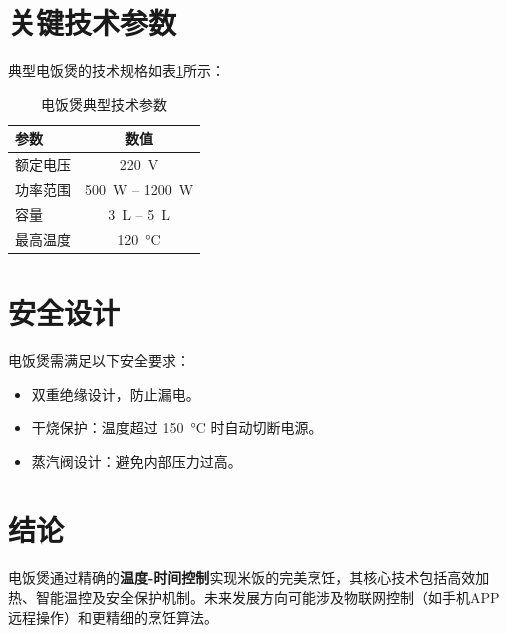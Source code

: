 \documentclass[UTF8]{ctexart}
\begin{document}
\section{关键技术参数}
典型电饭煲的技术规格如表\ref{tab:specs}所示：
\begin{table}[ht]%
    \centering
    \begin{tabular}{|l|c|}%
        \hline
        \textbf{参数} & \textbf{数值} \\ \hline
        额定电压 & \SI{220}{\volt} \\ \hline
        功率范围 & \SI{500}{\watt} -- \SI{1200}{\watt} \\ \hline
        容量 & \SI{3}{\liter} -- \SI{5}{\liter} \\ \hline
        最高温度 & \SI{120}{\celsius} \\
         \hline
    \end{tabular}
    \caption{电饭煲典型技术参数}
    \label{tab:specs}
\end{table}

\section{安全设计}
电饭煲需满足以下安全要求：
\begin{itemize}
    \item 双重绝缘设计，防止漏电。
    \item 干烧保护：温度超过 \SI{150}{\celsius} 时自动切断电源。
    \item 蒸汽阀设计：避免内部压力过高。
\end{itemize}

\section{结论}
电饭煲通过精确的\textbf{温度-时间控制}实现米饭的完美烹饪，其核心技术包括高效加热、智能温控及安全保护机制。未来发展方向可能涉及物联网控制（如手机APP远程操作）和更精细的烹饪算法。
\end{document}
